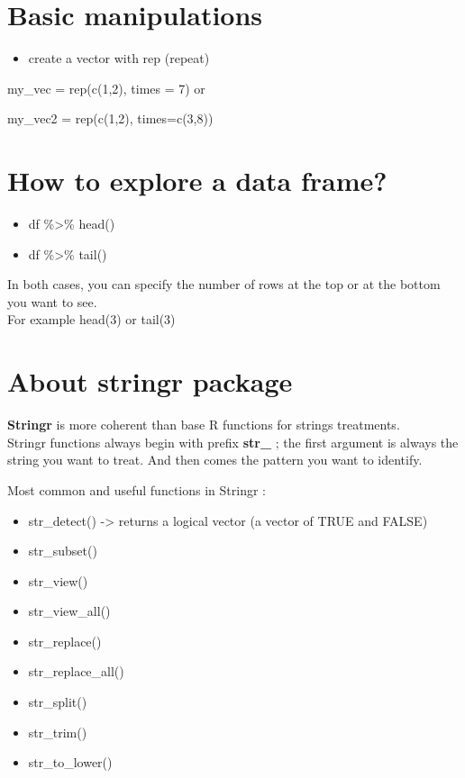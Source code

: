 \documentclass[
]{book}
\providecommand{\tightlist}{%
  \setlength{\itemsep}{0pt}\setlength{\parskip}{0pt}}
\begin{document}
\hypertarget{basic-manipulations}{%
\section{Basic manipulations}\label{basic-manipulations}}

\begin{itemize}
\tightlist
\item
  create a vector with rep (repeat)
\end{itemize}

my\_vec = rep(c(1,2), times = 7)
or

my\_vec2 = rep(c(1,2), times=c(3,8))

\hypertarget{how-to-explore-a-data-frame}{%
\section{How to explore a data frame?}\label{how-to-explore-a-data-frame}}

\begin{itemize}
\tightlist
\item
  df \%\textgreater\% head()
\item
  df \%\textgreater\% tail()
\end{itemize}

In both cases, you can specify the number of rows at the top or at the bottom you want to see.\\
For example head(3) or tail(3)

\hypertarget{about-stringr-package}{%
\section{About stringr package}\label{about-stringr-package}}

\textbf{Stringr} is more coherent than base R functions for strings treatments.\\
Stringr functions always begin with prefix \textbf{str\_} ; the first argument is always the string you want to treat. And then comes the pattern you want to identify.

Most common and useful functions in Stringr :

\begin{itemize}
\tightlist
\item
  str\_detect() -\textgreater{} returns a logical vector (a vector of TRUE and FALSE)
\item
  str\_subset()
\item
  str\_view()
\item
  str\_view\_all()
\item
  str\_replace()
\item
  str\_replace\_all()
\item
  str\_split()
\item
  str\_trim()
\item
  str\_to\_lower()
\end{itemize}
\end{document}
